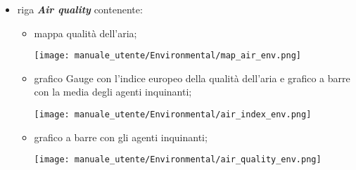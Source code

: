 \begin{itemize}
    \item riga \textit{\textbf{Air quality}} contenente:
    \begin{itemize}
        \item mappa qualità dell'aria;
        \begin{center}
            \texttt{[image: manuale\_utente/Environmental/map\_air\_env.png]}
        \end{center}
        \item grafico Gauge con l'indice europeo della qualità dell'aria e grafico a barre con la media degli agenti inquinanti;
        \begin{center}
            \texttt{[image: manuale\_utente/Environmental/air\_index\_env.png]}
        \end{center}
        \item grafico a barre con gli agenti inquinanti;
        \begin{center}
            \texttt{[image: manuale\_utente/Environmental/air\_quality\_env.png]}
        \end{center}
    \end{itemize}
\end{itemize}

